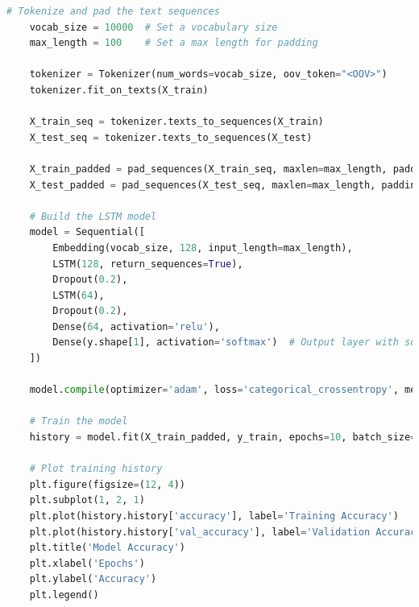\begin{tcolorbox}[colback=gray!5!white, colframe=gray!80!black, boxrule=0.5pt, title=LSTM Model Implementation]
    \begin{lstlisting}[language=Python]
    # Tokenize and pad the text sequences
    vocab_size = 10000  # Set a vocabulary size
    max_length = 100    # Set a max length for padding

    tokenizer = Tokenizer(num_words=vocab_size, oov_token="<OOV>")
    tokenizer.fit_on_texts(X_train)

    X_train_seq = tokenizer.texts_to_sequences(X_train)
    X_test_seq = tokenizer.texts_to_sequences(X_test)

    X_train_padded = pad_sequences(X_train_seq, maxlen=max_length, padding='post', truncating='post')
    X_test_padded = pad_sequences(X_test_seq, maxlen=max_length, padding='post', truncating='post')

    # Build the LSTM model
    model = Sequential([
        Embedding(vocab_size, 128, input_length=max_length),
        LSTM(128, return_sequences=True),
        Dropout(0.2),
        LSTM(64),
        Dropout(0.2),
        Dense(64, activation='relu'),
        Dense(y.shape[1], activation='softmax')  # Output layer with softmax for multi-class classification
    ])

    model.compile(optimizer='adam', loss='categorical_crossentropy', metrics=['accuracy'])

    # Train the model
    history = model.fit(X_train_padded, y_train, epochs=10, batch_size=32, validation_data=(X_test_padded, y_test))

    # Plot training history
    plt.figure(figsize=(12, 4))
    plt.subplot(1, 2, 1)
    plt.plot(history.history['accuracy'], label='Training Accuracy')
    plt.plot(history.history['val_accuracy'], label='Validation Accuracy')
    plt.title('Model Accuracy')
    plt.xlabel('Epochs')
    plt.ylabel('Accuracy')
    plt.legend()
\end{lstlisting}
\end{tcolorbox}

